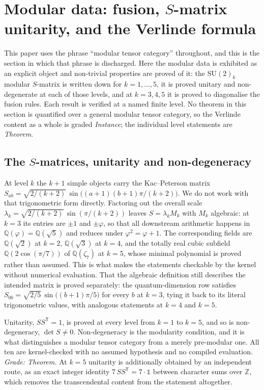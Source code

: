 \documentclass[aps,prx,nofootinbib,superscriptaddress,12pt]{revtex4-2}
\begin{document}
\section{Modular data: fusion, $S$-matrix unitarity, and the Verlinde formula}
\label{sec:modular}

This paper uses the phrase ``modular tensor category'' throughout, and
this is the section in which that phrase is discharged. Here the modular
data is exhibited as an explicit object and non-trivial properties are
proved of it: the $\mathrm{SU}(2)_k$ modular $S$-matrix is written down
for $k = 1,\dots,5$, it is proved unitary and non-degenerate at each of
those levels, and at $k = 3,4,5$ it is proved to diagonalise the fusion
rules. Each result is verified at a named finite level. No theorem in
this section is quantified over a general modular tensor category, so
the Verlinde content as a whole is graded \emph{Instance}; the
individual level statements are \emph{Theorem}.

\subsection{The $S$-matrices, unitarity and non-degeneracy}

At level $k$ the $k+1$ simple objects carry the Kac--Peterson matrix
$S_{ab} = \sqrt{2/(k+2)}\,\sin\bigl((a+1)(b+1)\pi/(k+2)\bigr)$. We do not
work with that trigonometric form directly. Factoring out the overall
scale $\lambda_k = \sqrt{2/(k+2)}\,\sin(\pi/(k+2))$ leaves
$S = \lambda_k M_k$ with $M_k$ algebraic: at $k = 3$ its entries are
$\pm 1$ and $\pm\varphi$, so that all downstream arithmetic happens in
$\mathbb{Q}(\varphi) = \mathbb{Q}(\sqrt5)$ and reduces under
$\varphi^2 = \varphi + 1$. The corresponding fields are
$\mathbb{Q}(\sqrt2)$ at $k = 2$, $\mathbb{Q}(\sqrt3)$ at $k = 4$, and the
totally real cubic subfield $\mathbb{Q}(2\cos(\pi/7))$ of
$\mathbb{Q}(\zeta_7)$ at $k = 5$, whose minimal polynomial is proved
rather than assumed. This is what makes the statements checkable by the
kernel without numerical evaluation. That the algebraic definition still
describes the intended matrix is proved separately: the quantum-dimension
row satisfies $S_{0b} = \sqrt{2/5}\,\sin\bigl((b+1)\pi/5\bigr)$ for every
$b$ at $k=3$, tying it back to its literal trigonometric values, with
analogous statements at $k = 4$ and $k = 5$.

Unitarity, $SS^{\mathsf T} = 1$, is proved at every level from $k = 1$ to
$k = 5$, and so is non-degeneracy, $\det S \neq 0$. Non-degeneracy is the
modularity condition, and it is what distinguishes a modular tensor
category from a merely pre-modular one. All ten are kernel-checked with
no assumed hypothesis and no compiled evaluation. \emph{Grade:
Theorem.} At $k = 5$ unitarity is additionally obtained by an
independent route, as an exact integer identity
$7\,SS^{\mathsf T} = 7\cdot\mathbb{1}$ between character sums over
$\mathbb{Z}$, which removes the transcendental content from the
statement altogether.
\end{document}
